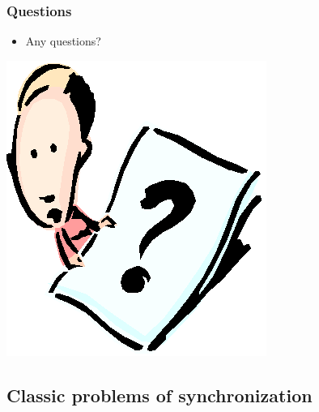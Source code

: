 \documentclass[CJKutf8,xcolor=pdftex,dvipsnames,table]{beamer}
\begin{document}
\begin{CJK*}{UTF8}{song}
  \begin{frame}
  \frametitle{Questions}
  \begin{itemize}
  \item{Any questions?}
  \end{itemize}
  \begin{center}
    \includegraphics[scale=.5]{question}
  \end{center}
  \end{frame}

\subsection{Classic problems of synchronization}


\end{CJK*}
\end{document}
